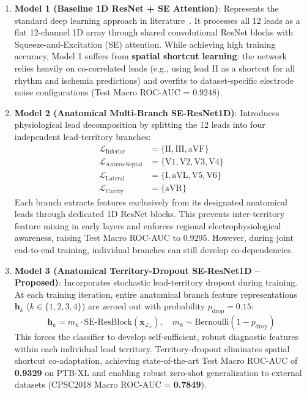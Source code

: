 \documentclass[5p,twocolumn,10pt]{elsarticle}
\begin{document}
\begin{enumerate}
    \item \textbf{Model 1 (Baseline 1D ResNet + SE Attention)}: Represents the standard deep learning approach in literature~\cite{strodthoff2020deep}. It processes all 12 leads as a flat 12-channel 1D array through shared convolutional ResNet blocks with Squeeze-and-Excitation (SE) attention. While achieving high training accuracy, Model 1 suffers from \textbf{spatial shortcut learning}: the network relies heavily on co-correlated leads (e.g., using lead II as a shortcut for all rhythm and ischemia predictions) and overfits to dataset-specific electrode noise configurations (Test Macro ROC-AUC = $0.9248$).
    
    \item \textbf{Model 2 (Anatomical Multi-Branch SE-ResNet1D)}: Introduces physiological lead decomposition by splitting the 12 leads into four independent lead-territory branches:
    \begin{align}
    \mathcal{L}_{\text{Inferior}} &= \{\text{II}, \text{III}, \text{aVF}\} \\
    \mathcal{L}_{\text{Antero-Septal}} &= \{\text{V1}, \text{V2}, \text{V3}, \text{V4}\} \\
    \mathcal{L}_{\text{Lateral}} &= \{\text{I}, \text{aVL}, \text{V5}, \text{V6}\} \\
    \mathcal{L}_{\text{Cavity}} &= \{\text{aVR}\}
    \end{align}
    Each branch extracts features exclusively from its designated anatomical leads through dedicated 1D ResNet blocks. This prevents inter-territory feature mixing in early layers and enforces regional electrophysiological awareness, raising Test Macro ROC-AUC to $0.9295$. However, during joint end-to-end training, individual branches can still develop co-dependencies.
    
    \item \textbf{Model 3 (Anatomical Territory-Dropout SE-ResNet1D -- Proposed)}: Incorporates stochastic lead-territory dropout during training. At each training iteration, entire anatomical branch feature representations $\mathbf{h}_k$ ($k \in \{1, 2, 3, 4\}$) are zeroed out with probability $p_{\text{drop}} = 0.15$:
    \begin{equation}
    \mathbf{h}_k = m_k \cdot \text{SE-ResBlock}(\mathbf{x}_{\mathcal{L}_k}), \quad m_k \sim \text{Bernoulli}(1 - p_{\text{drop}})
    \end{equation}
    This forces the classifier to develop self-sufficient, robust diagnostic features within each individual lead territory. Territory-dropout eliminates spatial shortcut co-adaptation, achieving state-of-the-art Test Macro ROC-AUC of \textbf{0.9329} on PTB-XL and enabling robust zero-shot generalization to external datasets (CPSC2018 Macro ROC-AUC = \textbf{0.7849}).
\end{enumerate}
\end{document}
